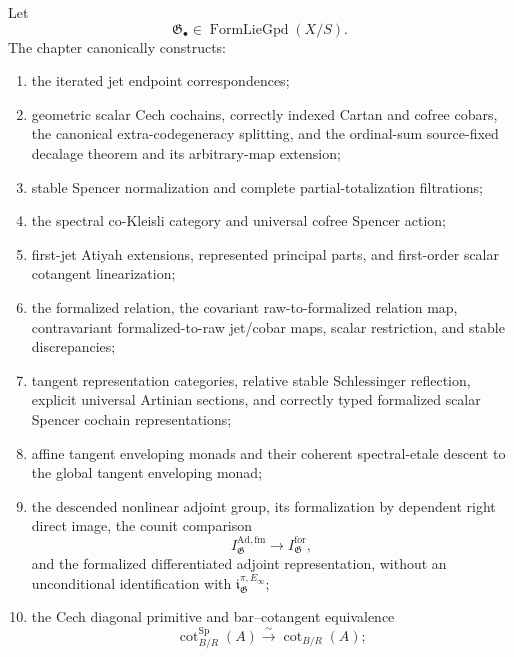\begin{theorem}
\label{thm:as-package}
Let
\[
    \mathfrak G_\bullet
    \in
    \operatorname{FormLieGpd}(X/S).
\]
The chapter canonically constructs:
\begin{enumerate}
    \item the iterated jet endpoint correspondences;

    \item geometric scalar Cech cochains, correctly indexed Cartan and cofree
    cobars, the canonical extra-codegeneracy splitting, and the ordinal-sum
    source-fixed decalage theorem and its arbitrary-map extension;

    \item stable Spencer normalization and complete partial-totalization
    filtrations;

    \item the spectral co-Kleisli category and universal cofree Spencer action;

    \item first-jet Atiyah extensions, represented principal parts, and
    first-order scalar cotangent linearization;

    \item the formalized relation, the covariant raw-to-formalized relation
    map, contravariant formalized-to-raw jet/cobar maps, scalar restriction,
    and stable discrepancies;

    \item tangent representation categories, relative stable Schlessinger
    reflection, explicit universal Artinian sections, and correctly typed
    formalized scalar Spencer cochain representations;

    \item affine tangent enveloping monads and their coherent spectral-etale
    descent to the global tangent enveloping monad;

    \item the descended nonlinear adjoint group, its formalization by
    dependent right direct image, the counit comparison
    \[
        I_{\mathfrak G}^{\mathrm{Ad,fm}}
        \longrightarrow
        I_{\mathfrak G}^{\mathrm{for}},
    \]
    and the formalized differentiated adjoint representation, without an
    unconditional identification with
    $\mathfrak i_{\mathfrak G}^{\pi,E_\infty}$;

    \item the Cech diagonal primitive and bar--cotangent equivalence
    \[
        \operatorname{cot}_{B/R}^{\mathrm{Sp}}(A)
        \xrightarrow{\sim}
        \operatorname{cot}_{B/R}(A);
    \]


\end{enumerate}
\end{theorem}
